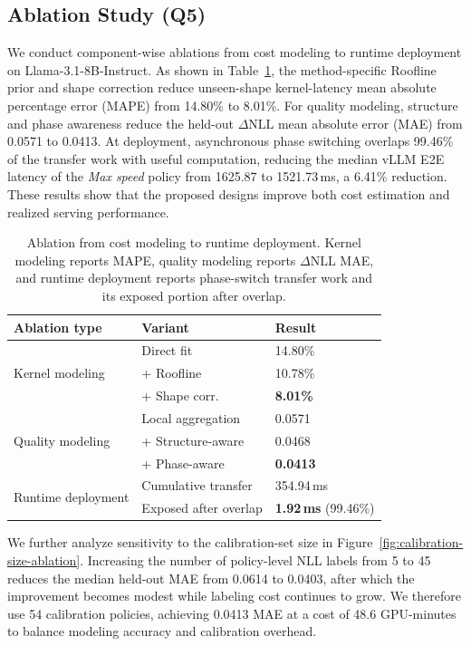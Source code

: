 \documentclass[letterpaper]{article} %
\begin{document}
\subsection{Ablation Study (Q5)}
\label{sec:ablation}

We conduct component-wise ablations from cost modeling to runtime deployment on Llama-3.1-8B-Instruct. As shown in Table~\ref{tab:modeling-ablation}, the method-specific Roofline prior and shape correction reduce unseen-shape kernel-latency mean absolute percentage error (MAPE) from 14.80\% to 8.01\%. For quality modeling, structure and phase awareness reduce the held-out $\Delta\mathrm{NLL}$ mean absolute error (MAE) from 0.0571 to 0.0413. At deployment, asynchronous phase switching overlaps 99.46\% of the transfer work with useful computation, reducing the median vLLM E2E latency of the \emph{Max speed} policy from 1625.87 to 1521.73\,ms, a 6.41\% reduction. These results show that the proposed designs improve both cost estimation and realized serving performance.

\begin{table}[t]
\centering
\small
\setlength{\tabcolsep}{2pt}
\begin{tabular}{@{}lll@{}}
\toprule
Ablation type & Variant & Result \\
\midrule
\multirow{3}{*}{Kernel modeling}
 & Direct fit & 14.80\% \\
 & + Roofline & 10.78\% \\
 & + Shape corr. & \textbf{8.01\%} \\
\midrule
\multirow{3}{*}{Quality modeling}
 & Local aggregation & 0.0571 \\
 & + Structure-aware & 0.0468 \\
 & + Phase-aware & \textbf{0.0413} \\
\midrule
\multirow{2}{*}{Runtime deployment}
 & Cumulative transfer & 354.94\,ms \\
 & Exposed after overlap & \textbf{1.92\,ms} (99.46\%) \\
\bottomrule
\end{tabular}
\caption{Ablation from cost modeling to runtime deployment. Kernel modeling reports MAPE, quality modeling reports $\Delta\mathrm{NLL}$ MAE, and runtime deployment reports phase-switch transfer work and its exposed portion after overlap.}
\label{tab:modeling-ablation}
\end{table}

We further analyze sensitivity to the calibration-set size in Figure~\ref{fig:calibration-size-ablation}. Increasing the number of policy-level NLL labels from 5 to 45 reduces the median held-out MAE from 0.0614 to 0.0403, after which the improvement becomes modest while labeling cost continues to grow. We therefore use 54 calibration policies, achieving 0.0413 MAE at a cost of 48.6 GPU-minutes to balance modeling accuracy and calibration overhead.
\end{document}
